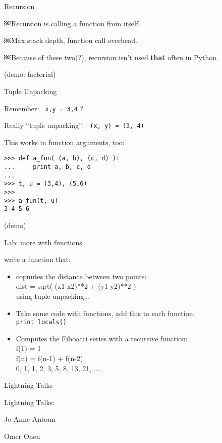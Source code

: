 \documentclass{beamer}
\begin{document}
\begin{frame}[fragile]{Recursion}

\vfill
{\Large￼Recursion is calling a function from itself.}

\vfill
{\Large￼Max stack depth, function call overhead.}

\vfill
{\Large￼Because of these two(?), recursion isn't used {\bf that} often in Python.}

\vfill
(demo: factorial)
\end{frame}

\begin{frame}[fragile]{Tuple Unpacking}

{\Large Remember: \verb| x,y = 3,4| ?}

\vfill
{\Large Really ``tuple unpacking'': \verb| (x, y) = (3, 4)|}

\vfill
{\Large This works in function arguments, too:}

\begin{verbatim}
>>> def a_fun( (a, b), (c, d) ):
...     print a, b, c, d
... 
>>> t, u = (3,4), (5,6)
>>> 
>>> a_fun(t, u)
3 4 5 6
\end{verbatim}
(demo)
\end{frame}


\begin{frame}[fragile]{Lab: more with functions}

{\Large write a function that:}
\begin{itemize}
  \item copnutes the distance between two points:\\
        dist = sqrt( (x1-x2)**2 + (y1-y2)**2 )\\
        using tuple unpacking...
  \item Take some code with functions, add this to each function:\\
        \verb|print locals()|
  \item Computes the Fiboacci series with a recursive function:\\
  f(1) = 1\\
  f(n) = f(n-1) + f(n-2)\\
  0, 1, 1, 2, 3, 5, 8, 13, 21, ...
\end{itemize}

\end{frame}

\begin{frame}[fragile]{Lightning Talks}

\vfill
{\LARGE Lightning Talks:}

\vfill
{\Large Jo-Anne Antoun }

\vfill
{\Large Omer Onen }

\vfill
\end{frame}
\end{document}
